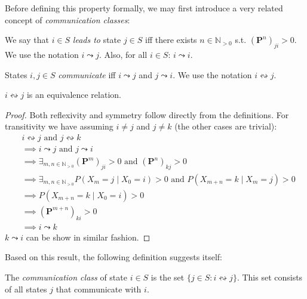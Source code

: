 \documentclass[../../main.tex]{subfiles}
\begin{document}
Before defining this property formally, we may first introduce a very related concept of \emph{communication classes}:

\begin{definition}
    We say that $i \in S$ \emph{leads to} state $j \in S$ iff there exists $n \in \mathbb{N}_{>0}$ s.t. $(\bm{P}^n)_{ji} > 0$. We use the notation $i \leadsto j$. Also, for all $i \in S$: $i \leadsto i$. 
\end{definition}

\begin{definition}
    States $i,j \in S$ \emph{communicate} iff $i \leadsto j$ and $j \leadsto i$. We use the notation $i \leftrightsquigarrow j$.
\end{definition}

\begin{theorem}
    $i \leftrightsquigarrow j$ is an equivalence relation.
\end{theorem}
\vspace{-2.5em}
\begin{proof}
    Both reflexivity and symmetry follow directly from the definitions. For transitivity we have assuming $i \neq j$ and $j \neq k$ (the other cases are trivial):
    \begin{align*}
        &i \leftrightsquigarrow j \text{ and } j \leftrightsquigarrow k \\
        &\implies i \leadsto j \text{ and } j \leadsto i \\
        &\implies \exists_{m,n \in \mathbb{N}_{>0}} (\bm{P}^m)_{ji} > 0 \text{ and } (\bm{P}^n)_{kj} > 0 \\
        &\implies \exists_{m,n \in \mathbb{N}_{>0}} P(X_m = j \mid X_0 = i) > 0 \text{ and } P(X_{m+n} = k \mid X_m = j) > 0 \\
        &\implies P(X_{m+n} = k \mid X_0 = i) > 0 \\
        &\implies (\bm{P}^{m+n})_{ki} > 0 \\
        &\implies i \leadsto k
    \end{align*}
    $k \leadsto i$ can be show in similar fashion.
\end{proof}

Based on this result, the following definition suggests itself:

\begin{definition}
    The \emph{communication class} of state $i \in S$ is the set $\{ j \in S : i \leftrightsquigarrow j \}$. This set consists of all states $j$ that communicate with $i$.
\end{definition}
\end{document}
